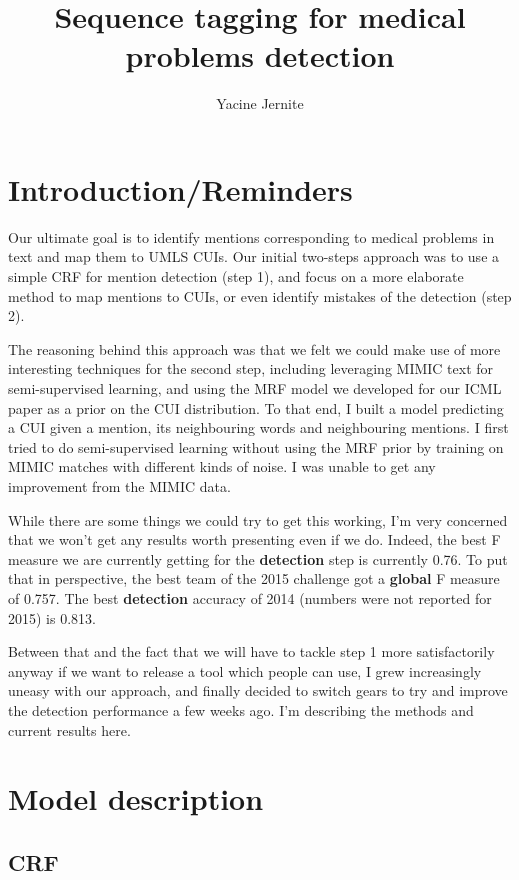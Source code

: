 \documentclass[10pt,a4paper]{article}
\author{Yacine Jernite}
\title{Sequence tagging for medical problems detection}
\begin{document}
\maketitle

\section{Introduction/Reminders}

  Our ultimate goal is to identify mentions corresponding to medical problems in text and map them to UMLS CUIs. Our initial two-steps approach was to use a simple CRF for mention detection (step 1), and focus on a more elaborate method to map mentions to CUIs, or even identify mistakes of the detection (step 2).

  The reasoning behind this approach was that we felt we could make use of more interesting techniques for the second step, including leveraging MIMIC text for semi-supervised learning, and using the MRF model we developed for our ICML paper as a prior on the CUI distribution. To that end, I built a model predicting a CUI given a mention, its neighbouring words and neighbouring mentions. I first tried to do semi-supervised learning without using the MRF prior by training on MIMIC matches with different kinds of noise. I was unable to get any improvement from the MIMIC data. 
  
  While there are some things we could try to get this working, I'm very concerned that we won't get any results worth presenting even if we do. Indeed, the best F measure we are currently getting for the {\bf{detection}} step is currently 0.76. To put that in perspective, the best team of the 2015 challenge got a {\bf{global}} F measure of 0.757. The best {\bf{detection}} accuracy of 2014 (numbers were not reported for 2015) is 0.813.
  
  Between that and the fact that we will have to tackle step 1 more satisfactorily anyway if we want to release a tool which people can use, I grew increasingly uneasy with our approach, and finally decided to switch gears to try and improve the detection performance a few weeks ago. I'm describing the methods and current results here.
  
\section{Model description}

\subsection{CRF}
\label{CRF}
\end{document}
